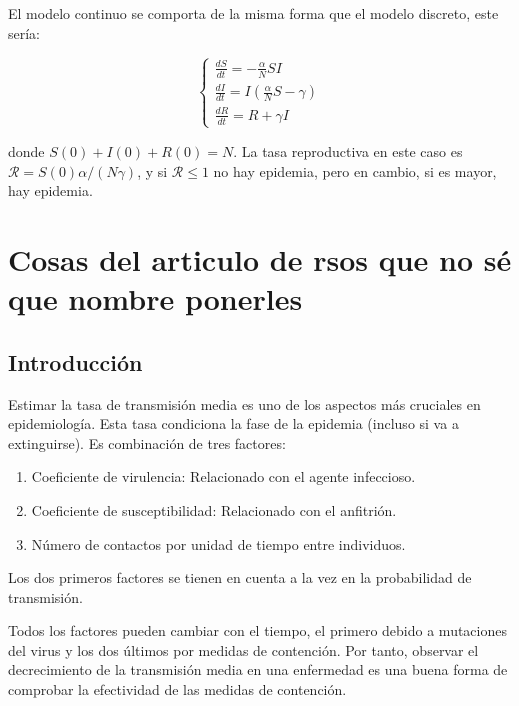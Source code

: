 El modelo continuo se comporta de la misma forma que el modelo discreto, este sería:

\begin{equation}
\label{eqn: modelo_SIR_continuo}
\begin{cases}
\frac{dS}{dt} = -\frac{\alpha}{N}SI \\
\frac{dI}{dt} = I\left(\frac{\alpha}{N}S-\gamma \right) \\
\frac{dR}{dt} = R+\gamma I
\end{cases}
\end{equation}

donde $S(0)+I(0)+R(0)=N$. La tasa reproductiva en este caso es $\mathcal{R}=S(0)\alpha /(N\gamma )$, y si $\mathcal{R}\leq 1$  no hay epidemia, pero en cambio, si es mayor, hay epidemia.







\section{Cosas del articulo de rsos que no sé que nombre ponerles}

\subsection{Introducción}

Estimar la tasa de transmisión media es uno de los aspectos más cruciales en epidemiología. Esta tasa condiciona la fase de la epidemia (incluso si va a extinguirse). Es combinación de tres factores:

\begin{enumerate}
\item Coeficiente de virulencia: Relacionado con el agente infeccioso.
\item Coeficiente de susceptibilidad: Relacionado con el anfitrión.
\item Número de contactos por unidad de tiempo entre individuos.
\end{enumerate}

Los dos primeros factores se tienen en cuenta a la vez en la probabilidad de transmisión.

Todos los factores pueden cambiar con el tiempo, el primero debido a mutaciones del virus y los dos últimos por medidas de contención. Por tanto, observar el decrecimiento de la transmisión media en una enfermedad es una buena forma de comprobar la efectividad de las medidas de contención.

